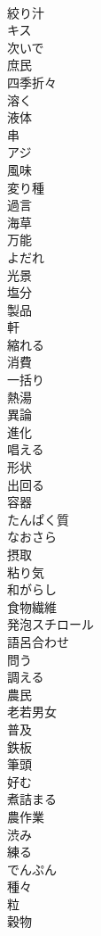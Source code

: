 \documentclass[8pt]{extreport}
\begin{document}
\begin{CJK}{UTF8}{min}
\\	絞り汁
\\	キス
\\	次いで
\\	庶民
\\	四季折々
\\	溶く
\\	液体
\\	串
\\	アジ
\\	風味
\\	変り種
\\	過言
\\	海草
\\	万能
\\	よだれ
\\	光景
\\	塩分
\\	製品
\\	軒
\\	縮れる
\\	消費
\\	一括り
\\	熱湯
\\	異論
\\	進化
\\	唱える
\\	形状
\\	出回る
\\	容器
\\	たんぱく質
\\	なおさら
\\	摂取
\\	粘り気
\\	和がらし
\\	食物繊維
\\	発泡スチロール
\\	語呂合わせ
\\	問う
\\	調える
\\	農民
\\	老若男女
\\	普及
\\	鉄板
\\	筆頭
\\	好む
\\	煮詰まる
\\	農作業
\\	渋み
\\	練る
\\	でんぷん
\\	種々
\\	粒
\\	穀物

\end{CJK}
\end{document}
